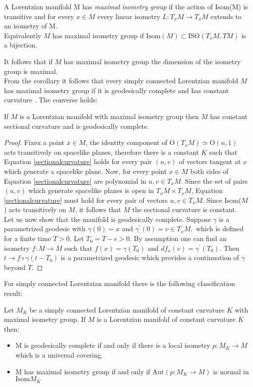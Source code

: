 \begin{definition}
    A Lorentzian manifold M has \textit{maximal isometry group} if the action of Isom(M) is transitive and for every $x\in M$ every linear isometry $L: T_xM \to T_xM$ extends to an isometry of M.\\
    Equivalently $M$ has maximal isometry group if $\text{Isom}(M) \subset \text{ISO}(T_xM, TM)$ is a bijection.
\end{definition}
It follows that if $M$ has maximal isometry group the dimension of the isometry group is maximal.\\
From the corollary it follows that every simply connected Lorentzian manifold $M$ has maximal isometry group if it is geodesically complete and has constant curvature . The converse holds:
\begin{lemma}
    If $M$ is a Lorentzian manifold with maximal isometry group then $M$ has constant sectional curvature and is geodesically complete.
\end{lemma}

\begin{proof}
    Fixex a point $x\in M$, the identity component of $\text{O}(T_x M)\simeq \text{O}(n,1)$ acts transitively on spacelike planes, therefore there is a constant $K$ such that Equation \ref{sectionalcurvature} holds for every pair $(u,v)$ of vectors tangent at $x$ which generate a spacelike plane. Now, for every point $x\in M$ both sides of Equation \ref{sectionalcurvature} are polynomial in $u,v \in T_xM$. Since the set of pairs $(u,v)$ which generate spacelike planes is open in $T_{x}M\times T_{x}M$, Equation \ref{sectionalcurvature} must hold for every pair of vectors $u,v \in T_xM$. Since Isom($M$) acts transitively on $M$, it follows that $M$ the sectional curvature is constant.\\
    Let us now show that the manifold is geodesically complete. Suppose $\gamma$ is a parametrized geodesic with $\gamma(0)=x$ and $\gamma^{\prime} (0)=v\in T_xM,$ which is defined for a finite time $T>0.$ Let $T_0=T-\epsilon>0.$ By assumption one can find an isometry $f:M\to M$ such that $f(x)=\gamma(T_0)$ and $df_x(v)=\gamma^{\prime}(T_0).$ Then $t\to f\circ\gamma(t-T_0)$ is a parametrized geodesic which provides a continuation of $\gamma$ beyond $T$.
\end{proof}


For simply connected Lorentzian manifold there is the following classification result:
\begin{proposition}
    Let $M_K$ be a simply connected Lorentzian manifold of constant curvature $K$ with maximal isometry group. If $M$ is a Lorentzian manifold of constant curvature $K$ then:
    \begin{itemize}
        \item M is geodesically complete if and only if there is a local isometry $p:M_K \to M$ which is a universal covering.
        \item M has maximal isometry group if and only if $\text{Aut}(p:M_K \to M)$ is normal in $\text{Isom}M_K$
    \end{itemize}
\end{proposition} 

